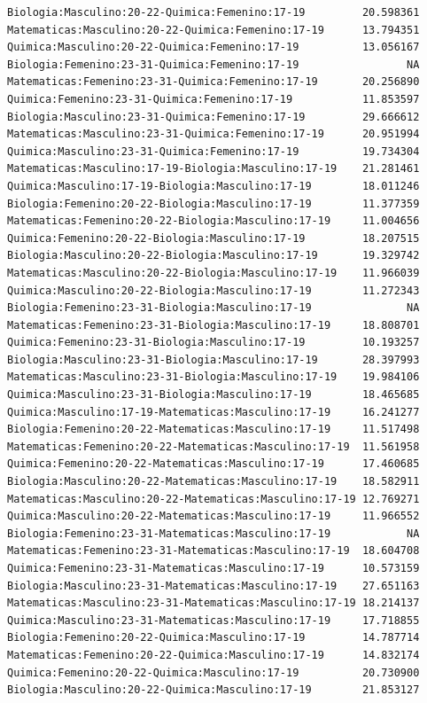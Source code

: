 \documentclass{rapport}
\begin{document}
\begin{itemize}
\begin{verbatim}
Biologia:Masculino:20-22-Quimica:Femenino:17-19         20.598361
Matematicas:Masculino:20-22-Quimica:Femenino:17-19      13.794351
Quimica:Masculino:20-22-Quimica:Femenino:17-19          13.056167
Biologia:Femenino:23-31-Quimica:Femenino:17-19                 NA
Matematicas:Femenino:23-31-Quimica:Femenino:17-19       20.256890
Quimica:Femenino:23-31-Quimica:Femenino:17-19           11.853597
Biologia:Masculino:23-31-Quimica:Femenino:17-19         29.666612
Matematicas:Masculino:23-31-Quimica:Femenino:17-19      20.951994
Quimica:Masculino:23-31-Quimica:Femenino:17-19          19.734304
Matematicas:Masculino:17-19-Biologia:Masculino:17-19    21.281461
Quimica:Masculino:17-19-Biologia:Masculino:17-19        18.011246
Biologia:Femenino:20-22-Biologia:Masculino:17-19        11.377359
Matematicas:Femenino:20-22-Biologia:Masculino:17-19     11.004656
Quimica:Femenino:20-22-Biologia:Masculino:17-19         18.207515
Biologia:Masculino:20-22-Biologia:Masculino:17-19       19.329742
Matematicas:Masculino:20-22-Biologia:Masculino:17-19    11.966039
Quimica:Masculino:20-22-Biologia:Masculino:17-19        11.272343
Biologia:Femenino:23-31-Biologia:Masculino:17-19               NA
Matematicas:Femenino:23-31-Biologia:Masculino:17-19     18.808701
Quimica:Femenino:23-31-Biologia:Masculino:17-19         10.193257
Biologia:Masculino:23-31-Biologia:Masculino:17-19       28.397993
Matematicas:Masculino:23-31-Biologia:Masculino:17-19    19.984106
Quimica:Masculino:23-31-Biologia:Masculino:17-19        18.465685
Quimica:Masculino:17-19-Matematicas:Masculino:17-19     16.241277
Biologia:Femenino:20-22-Matematicas:Masculino:17-19     11.517498
Matematicas:Femenino:20-22-Matematicas:Masculino:17-19  11.561958
Quimica:Femenino:20-22-Matematicas:Masculino:17-19      17.460685
Biologia:Masculino:20-22-Matematicas:Masculino:17-19    18.582911
Matematicas:Masculino:20-22-Matematicas:Masculino:17-19 12.769271
Quimica:Masculino:20-22-Matematicas:Masculino:17-19     11.966552
Biologia:Femenino:23-31-Matematicas:Masculino:17-19            NA
Matematicas:Femenino:23-31-Matematicas:Masculino:17-19  18.604708
Quimica:Femenino:23-31-Matematicas:Masculino:17-19      10.573159
Biologia:Masculino:23-31-Matematicas:Masculino:17-19    27.651163
Matematicas:Masculino:23-31-Matematicas:Masculino:17-19 18.214137
Quimica:Masculino:23-31-Matematicas:Masculino:17-19     17.718855
Biologia:Femenino:20-22-Quimica:Masculino:17-19         14.787714
Matematicas:Femenino:20-22-Quimica:Masculino:17-19      14.832174
Quimica:Femenino:20-22-Quimica:Masculino:17-19          20.730900
Biologia:Masculino:20-22-Quimica:Masculino:17-19        21.853127

\end{verbatim}
\end{itemize}
\end{document}
